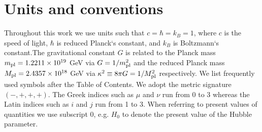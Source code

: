 
\section*{Units and conventions}

Throughout this work we use units such that $c=\hbar=k_B=1$, where $c$ is the speed of light, $\hbar$ is reduced Planck`s constant, and $k_B$ is Boltzmann`s constant.The gravitational constant $G$ is related to the Planck mass $m_{\text{\scriptsize pl}}=1.2211\times10^{19}$ GeV via $G=1/m_{\text{\scriptsize pl}}^2$ and the reduced Planck mass $M_{\text{\scriptsize pl}} = 2.4357\times10^{18}$ GeV via $\kappa^2\equiv8\pi G=1/M_{\text{\scriptsize pl}}^2$ respectively. We list frequently used symbols after the Table of Contents. We adopt the metric signature $(-, +, +, +)$. The Greek indices such as $\mu$ and $\nu$ run from 0 to 3 whereas the Latin indices such as $i$ and $j$ run from 1 to 3. When referring to present values of quantities we use subscript $0$, e.g. $H_0$ to denote the present value of the Hubble parameter.